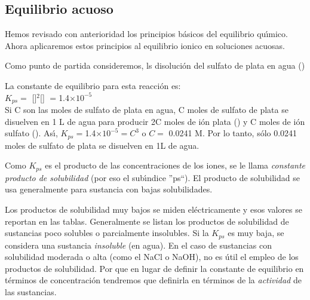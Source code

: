 \subsection{Equilibrio acuoso}
\label{eacuoso}

Hemos revisado con anterioridad los principios b\'asicos del equilibrio qu\'{\i}mico. Ahora aplicaremos estos principios al equilibrio ionico en soluciones acuosas.

Como punto de partida consideremos, ls disoluci\'on del sulfato de plata en agua ()
 
La constante de equilibrio para esta reacci\'on es:\\[2pt]

\hskip 3cm $K_{ps} = $ []$^2$[] $=$1.4$\times10^{-5}$\\[2pt]

Si C son las moles de sulfato de plata en agua,  C moles de sulfato de plata se disuelven en 1 L de agua para producir 2C moles de i\'on plata () y C moles de i\'on sulfato (). As\'{\i}, $K_{ps}=$1.4$\times10^{-5} = C^3$ o $C=$ 0.0241 M. Por lo tanto, s\'olo 0.0241 moles de sulfato de plata se disuelven en 1L de agua.

Como $K_{ps}$ es el producto de las concentraciones de los iones, se le llama \emph{constante producto de solubilidad} (por eso el sub\'{\i}ndice ''ps``). El producto de solubilidad se usa generalmente para sustancia con bajas solubilidades. 

Los productos de solubilidad muy bajos se miden el\'ectricamente y esos valores se reportan en las tablas. Generalmente se listan los productos de solubilidad de sustancias poco solubles o parcialmente insolubles. Si la $K_{ps}$ es muy baja, se considera una sustancia \emph{insoluble} (en agua). En el caso de sustancias con solubilidad moderada o alta (como el NaCl o NaOH), no es \'util el empleo de los productos de solubilidad. Por que en lugar de definir  la constante de equilibrio en t\'erminos de concentraci\'on tendremos que definirla en t\'erminos de la \emph{actividad} de las sustancias.

